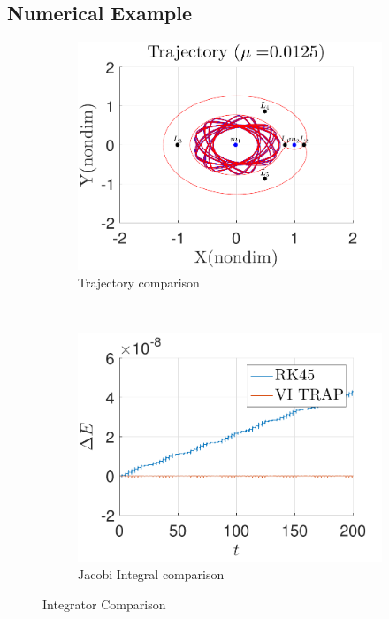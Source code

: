 \documentclass[preprint]{elsarticle}
\begin{document}
\subsection{Numerical Example}\label{sec:variational_example}
\begin{figure} 
	\centering 
	\begin{subfigure}[h]{0.5\textwidth} 
		\includegraphics[width=\textwidth]{trajectory} 
		\caption{Trajectory comparison} \label{fig:compare_trajectory} 
	\end{subfigure}~ %
	\begin{subfigure}[htbp]{0.5\textwidth} 
		\includegraphics[width=\textwidth]{energy} 
		\caption{Jacobi Integral comparison} \label{fig:compare_energy} 
	\end{subfigure} 
	\caption{Integrator Comparison}
	\label{fig:integrator_compare} 
\end{figure}
\end{document}
